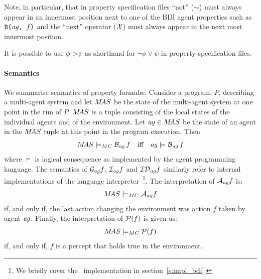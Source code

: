 Note, in particular, that in property specification files ``not'' ($\sim$) must always appear in an innermost position next to one of the BDI agent properties such as $\texttt{B(}\mathit{ag}\texttt{, }f\texttt{)}$  and the ``next'' operator ($\mathcal{X}$) must always appear in the next most innermost position.

It is possible to use $\phi \texttt{->} \psi$ as shorthand for $\neg \phi \vee \psi$ in property specification files.

\medskip

\paragraph{Semantics}
We summarise semantics of property formul\ae{}.
Consider a program, $P$, describing a multi-agent system and let
$M\!AS$ be the state of the multi-agent system at one point in the run
of $P$.  $M\!AS$ is a tuple consisting of the local states of the individual agents and of the environment. Let $\mathit{ag} \in M\!AS$ be the state of an agent in the $M\!AS$ tuple at this point in the 
program execution. Then 
$$
M\!AS \models_{MC} \mathrm{{\cal B}}_{\mathit{ag}} \, f \text{\quad iff\quad }
\mathit{ag} \models  \mathrm{{\cal B}}_{\mathit{ag}} \, f
$$
where $\models$ is logical consequence as implemented by the agent
programming language\index{$\lbeliefop$}. The semantics of $\mathrm{{\cal G}}_{\mathit{ag}} f$\index{$\lgoalop$}, $\mathrm{{\cal I}}_{\mathit{ag}} f$\index{$\lintentionfunc$} and $\mathrm{{\cal ID}}_{\mathit{ag}} f$\index{$\lintendtodofunc$} similarly refer to internal implementations of the language interpreter~\footnote{We briefly cover the \gwendolen\ implementation in section~\ref{s:impl_bdi}.}.  
The interpretation of $\mathrm{{\cal A}}_{\mathit{ag}} f$\index{$\lactionsfunc$} is:
$$M\!AS \models_{MC}
\mathrm{{\cal A}}_{\mathit{ag}} f$$ if, and only if, the last action changing
the environment was action $f$ taken by agent $\mathit{ag}$.  Finally, the interpretation of
$\mathrm{{\cal P}}(f)$ is given as:
$$M\!AS
\models_{MC} \mathrm{{\cal P}}(f)$$\index{$\lperceptfunc$} if, and only if, $f$ is a percept that
holds true in the environment.
\medskip

